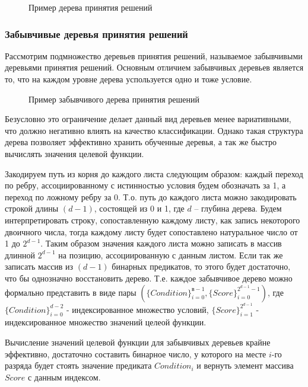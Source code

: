 \documentclass[12pt,a4paper]{report}
\begin{document}
\begin{figure}[H]
\center{\texttt{[image: dt]}}
\caption{Пример дерева принятия решений}
\label{ris:dt}
\end{figure}

\subsubsection{Забывчивые деревья принятия решений}
Рассмотрим подмножество деревьев принятия решений, называемое забывчивыми деревьями принятия решений.
Основным отличием забывчивых деревьев является то, что на каждом уровне дерева успользуется одно и тоже условие. 

\begin{figure}[H]
\center{\texttt{[image: ot]}}
\caption{Пример забывчивого дерева принятия решений}
\label{ris:ot}
\end{figure}

Безусловно это ограничение делает данный вид деревьев менее вариативными, что должно негативно влиять на качество классификации. Однако такая структура дерева позволяет эффективно хранить обученные деревья, а так же быстро вычислять значения целевой функции.

Закодируем путь из корня до каждого листа следующим образом: каждый переход по ребру, ассоциированному с истинностью условия будем обозначать за 1, а переход по ложному ребру за 0. Т.о. путь до каждого листа можно закодировать строкой длины $(d-1)$, состоящей из 0 и 1, где $d$ -- глубина дерева. Будем интерпретировать строку, сопоставленную каждому листу, как запись некоторого двоичного числа, тогда каждому листу будет сопоставлено натуральное число от 1 до $2^{d-1}$.
Таким образом значения каждого листа можно записать в массив длинной $2^{d-1}$ на позицию, ассоциированную с данным листом. Если так же записать массив из $(d-1)$ бинарных предикатов, то этого будет достаточно, что бы однозначно восстановить дерево.
Т.е. каждое забывчивое дерево можно формально представить в виде пары $(\{Condition\}_{i=0}^{в - 1}, \{Score\}_{i=0}^{2^{d - 1} - 1})$, где $\{Condition\}_{i=0}^{d - 2}$ - индексированное множество условий, $\{Score\}_{i=1}^{2^{d - 1}}$ - индексированное множество значений целеой функции.

Вычисление значений целевой функции для забывчивых деревьев крайне эффективно, достаточно составить бинарное число, у которого на месте $i$-го разряда будет стоять значение предиката $Condition_i$ и вернуть элемент массива $Score$ с данным индексом.
\end{document}
